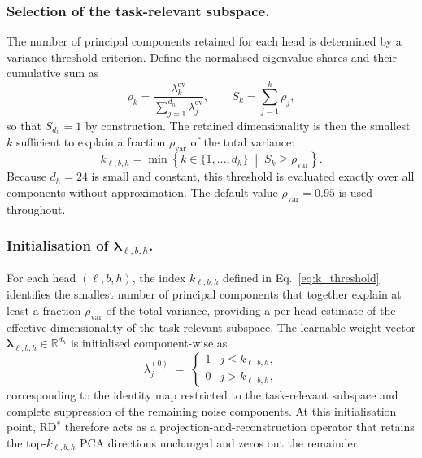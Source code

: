 \subsubsection{Selection of the task-relevant subspace.}
The number of principal components retained for each head is determined
by a variance-threshold criterion. Define the normalised eigenvalue
shares and their cumulative sum as
\begin{equation}
    \rho_k
    = \frac{\lambda^{\mathrm{ev}}_k}{\sum_{j=1}^{d_h} \lambda^{\mathrm{ev}}_j},
    \qquad
    S_k = \sum_{j=1}^{k} \rho_j,
\end{equation}
so that $S_{d_h} = 1$ by construction. The retained dimensionality is
then the smallest $k$ sufficient to explain a fraction $\rho_{\mathrm{var}}$
of the total variance:
\begin{equation}
    k_{\ell,b,h}
    = \min\!\left\{
        k \in \{1, \ldots, d_h\}
        \;\middle|\;
        S_k \ge \rho_{\mathrm{var}}
      \right\}.
    \label{eq:k_threshold}
\end{equation}
Because $d_h = 24$ is small and constant, this threshold is evaluated
exactly over all components without approximation. The default value
$\rho_{\mathrm{var}} = 0.95$ is used throughout.

\subsubsection{Initialisation of $\boldsymbol{\lambda}_{\ell,b,h}$.}
For each head $(\ell,b,h)$, the index $k_{\ell,b,h}$ defined in
Eq.~\eqref{eq:k_threshold} identifies the smallest number of principal
components that together explain at least a fraction $\rho_{\mathrm{var}}$
of the total variance, providing a per-head estimate of the effective
dimensionality of the task-relevant subspace.
The learnable weight vector
$\boldsymbol{\lambda}_{\ell,b,h} \in \mathbb{R}^{d_h}$
is initialised component-wise as
\begin{equation}
    \lambda_j^{(0)}
    \;=\; \begin{cases}
        1 & j \le k_{\ell,b,h}, \\
        0 & j > k_{\ell,b,h},
    \end{cases}
    \label{eq:lambda_init}
\end{equation}
corresponding to the identity map restricted to the task-relevant
subspace and complete suppression of the remaining noise components.
At this initialisation point, RD$^*$\xspace therefore acts as a
projection-and-reconstruction operator that retains the top-$k_{\ell,b,h}$
PCA directions unchanged and zeros out the remainder.

